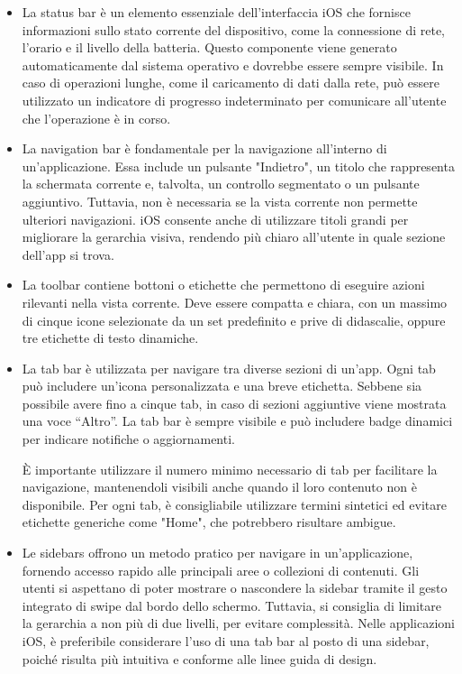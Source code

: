 \begin{itemize}
    \item La status bar è un elemento essenziale dell'interfaccia iOS che fornisce informazioni sullo stato corrente del dispositivo, come la connessione di rete, l'orario e il livello della batteria. Questo componente viene generato automaticamente dal sistema operativo e dovrebbe essere sempre visibile. In caso di operazioni lunghe, come il caricamento di dati dalla rete, può essere utilizzato un indicatore di progresso indeterminato per comunicare all’utente che l’operazione è in corso.

    \item La navigation bar è fondamentale per la navigazione all'interno di un'applicazione. Essa include un pulsante "Indietro", un titolo che rappresenta la schermata corrente e, talvolta, un controllo segmentato o un pulsante aggiuntivo. Tuttavia, non è necessaria se la vista corrente non permette ulteriori navigazioni. iOS consente anche di utilizzare titoli grandi per migliorare la gerarchia visiva, rendendo più chiaro all'utente in quale sezione dell’app si trova.

    \item La toolbar contiene bottoni o etichette che permettono di eseguire azioni rilevanti nella vista corrente. Deve essere compatta e chiara, con un massimo di cinque icone selezionate da un set predefinito e prive di didascalie, oppure tre etichette di testo dinamiche.

    \item La tab bar è utilizzata per navigare tra diverse sezioni di un’app. Ogni tab può includere un'icona personalizzata e una breve etichetta. Sebbene sia possibile avere fino a cinque tab, in caso di sezioni aggiuntive viene mostrata una voce “Altro”. La tab bar è sempre visibile e può includere badge dinamici per indicare notifiche o aggiornamenti. 
    
    È importante utilizzare il numero minimo necessario di tab per facilitare la navigazione, mantenendoli visibili anche quando il loro contenuto non è disponibile. Per ogni tab, è consigliabile utilizzare termini sintetici ed evitare etichette generiche come "Home", che potrebbero risultare ambigue.

    \item Le sidebars offrono un metodo pratico per navigare in un’applicazione, fornendo accesso rapido alle principali aree o collezioni di contenuti. Gli utenti si aspettano di poter mostrare o nascondere la sidebar tramite il gesto integrato di swipe dal bordo dello schermo. Tuttavia, si consiglia di limitare la gerarchia a non più di due livelli, per evitare complessità. Nelle applicazioni iOS, è preferibile considerare l’uso di una tab bar al posto di una sidebar, poiché risulta più intuitiva e conforme alle linee guida di design.
\end{itemize}

